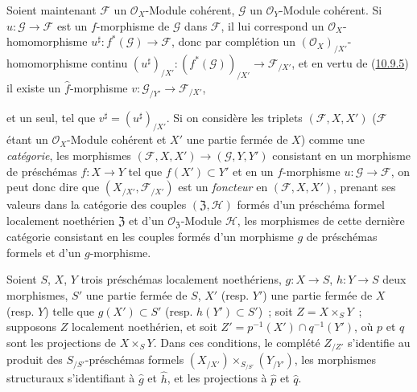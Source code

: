 \begin{env}[10.9.6]
\label{I.10.9.6-fr}
Soient maintenant $\mathscr{F}$ un $\mathscr{O}_X$-Module cohérent,
$\mathscr{G}$ un $\mathscr{O}_Y$-Module cohérent. Si
$u:\mathscr{G}\to\mathscr{F}$ est un $f$-morphisme de $\mathscr{G}$ dans
$\mathscr{F}$, il lui correspond un $\mathscr{O}_X$-homomorphisme
$u^\sharp:f^*(\mathscr{G})\to\mathscr{F}$, donc par complétion un
$(\mathscr{O}_X)_{/X'}$-homomorphisme continu
$(u^\sharp)_{/X'}:(f^*(\mathscr{G}))_{/X'}\to\mathscr{F}_{/X'}$, et en
vertu de (\hyperref[I.10.9.5-fr]{10.9.5}) il existe un
$\widehat f$-morphisme $v:\mathscr{G}_{/Y'}\to\mathscr{F}_{/X'}$,

et un seul, tel que $v^\sharp=(u^\sharp)_{/X'}$. Si on considère les
triplets $(\mathscr{F},X,X')$ ($\mathscr{F}$ étant un
$\mathscr{O}_X$-Module cohérent et $X'$ une partie fermée de $X$) comme
une \emph{catégorie}, les morphismes
$(\mathscr{F},X,X')\to(\mathscr{G},Y,Y')$ consistant en un morphisme de
préschémas $f:X\to Y$ tel que $f(X')\subset Y'$ et en un
$f$-morphisme $u:\mathscr{G}\to\mathscr{F}$, on peut donc dire que
$(X_{/X'},\mathscr{F}_{/X'})$ est un \emph{foncteur} en
$(\mathscr{F},X,X')$, prenant ses valeurs dans la catégorie des couples
$(\mathfrak{Z},\mathscr{H})$ formés d'un préschéma formel localement
noethérien $\mathfrak{Z}$ et d'un
$\mathscr{O}_{\mathfrak{Z}}$-Module $\mathscr{H}$, les morphismes de
cette dernière catégorie consistant en les couples formés d'un morphisme
$g$ de préschémas formels et d'un $g$-morphisme.
\end{env}

\begin{proposition}[10.9.7]
\label{I.10.9.7-fr}
Soient $S$, $X$, $Y$ trois préschémas localement noethériens,
$g:X\to S$, $h:Y\to S$ deux morphismes, $S'$ une partie fermée de $S$,
$X'$ \textup{(resp. $Y'$)} une partie fermée de $X$ \textup{(resp. $Y$)} telle que
$g(X')\subset S'$ \textup{(resp. $h(Y')\subset S'$)}~; soit
$Z=X\times_S Y$~; supposons $Z$ localement noethérien, et soit
$Z'=p^{-1}(X')\cap q^{-1}(Y')$, où $p$ et $q$ sont les projections de
$X\times_S Y$. Dans ces conditions, le complété $Z_{/Z'}$ s'identifie au
produit des $S_{/S'}$-préschémas formels
$(X_{/X'})\times_{S_{/S'}}(Y_{/Y'})$, les morphismes structuraux
s'identifiant à $\widehat g$ et $\widehat h$, et les projections à
$\widehat p$ et $\widehat q$.
\end{proposition}

